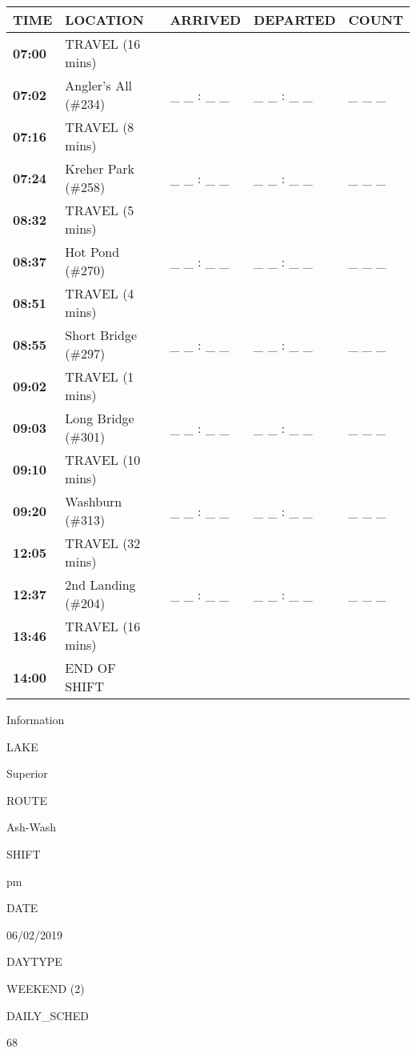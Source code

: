 \documentclass[]{article}
\begin{document}
\begin{tabular}{>{\bfseries}lllll}
\toprule
\textbf{TIME} & \textbf{LOCATION} & \textbf{ARRIVED} & \textbf{DEPARTED} & \textbf{COUNT}\\
\midrule
07:00 & TRAVEL (16 mins) &  &  & \\
07:02 & Angler's All (\#234) & \_ \_ : \_ \_ & \_ \_ : \_ \_ & \_ \_ \_\\
07:16 & TRAVEL (8 mins) &  &  & \\
07:24 & Kreher Park (\#258) & \_ \_ : \_ \_ & \_ \_ : \_ \_ & \_ \_ \_\\
08:32 & TRAVEL (5 mins) &  &  & \\
08:37 & Hot Pond (\#270) & \_ \_ : \_ \_ & \_ \_ : \_ \_ & \_ \_ \_\\
08:51 & TRAVEL (4 mins) &  &  & \\
08:55 & Short Bridge (\#297) & \_ \_ : \_ \_ & \_ \_ : \_ \_ & \_ \_ \_\\
09:02 & TRAVEL (1 mins) &  &  & \\
09:03 & Long Bridge (\#301) & \_ \_ : \_ \_ & \_ \_ : \_ \_ & \_ \_ \_\\
09:10 & TRAVEL (10 mins) &  &  & \\
09:20 & Washburn (\#313) & \_ \_ : \_ \_ & \_ \_ : \_ \_ & \_ \_ \_\\
12:05 & TRAVEL (32 mins) &  &  & \\
12:37 & 2nd Landing (\#204) & \_ \_ : \_ \_ & \_ \_ : \_ \_ & \_ \_ \_\\
13:46 & TRAVEL (16 mins) &  &  & \\
14:00 & END OF SHIFT &  &  & \\
\bottomrule
\end{tabular}\newpage

Information

LAKE

Superior

ROUTE

Ash-Wash

SHIFT

pm

DATE

06/02/2019

DAYTYPE

WEEKEND (2)

DAILY\_SCHED

68

\vspace{24pt}
\end{document}
